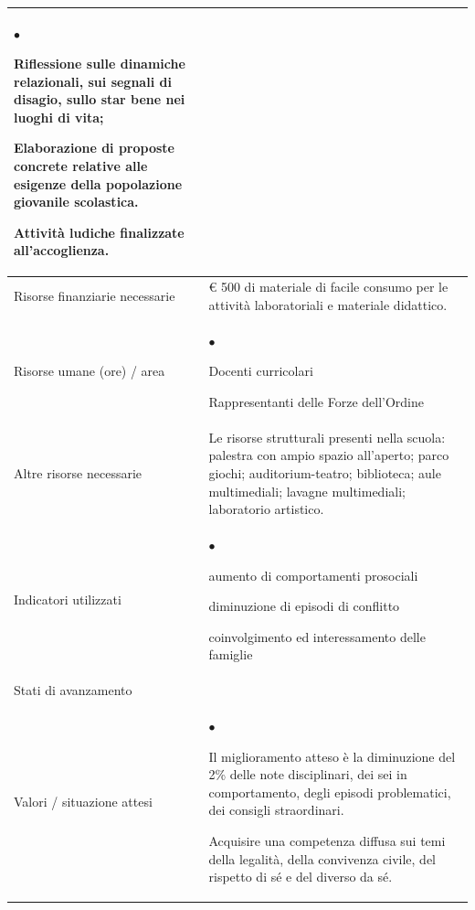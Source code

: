 \documentclass[12pt,a4paper,oneside]{memoir}
\newenvironment{elenco}{\begin{list}{$\bullet$}{%
              \setlength{\leftmargin}{4mm}%
              \setlength{\rightmargin}{1mm}%
               \setlength{\itemindent}{0mm}%
               \setlength{\labelwidth}{2mm}%
               \setlength{\labelsep}{2mm}%
              \setlength{\itemsep}{-\parsep}%
              \setlength{\partopsep}{0pt}%
              \setlength{\topsep}{0pt}%
             \setlength{\parskip}{0pt}%
              }}{\end{list}}
\begin{document}
\begin{footnotesize}
\begin{longtable}{|>{\raggedright}p{2.5cm}|>{\raggedright\arraybackslash}P{10cm}|}
\begin{elenco}
\item Riflessione sulle dinamiche relazionali, sui segnali di disagio, sullo star bene nei luoghi di vita;
\item Elaborazione di proposte concrete relative alle esigenze della popolazione giovanile scolastica.
\item Attività ludiche finalizzate all'accoglienza.
\end{elenco}\\[-4mm] \hline
Risorse finanziarie necessarie&€ 500 di materiale di facile consumo per le attività laboratoriali e materiale didattico. \\ \hline
Risorse umane (ore) / area&
\begin{elenco}
\item Docenti curricolari
\item  Rappresentanti delle Forze dell'Ordine
\end{elenco}\\[-4mm] \hline
Altre risorse necessarie&Le risorse strutturali presenti nella scuola: palestra con ampio spazio all'aperto; parco giochi; auditorium-teatro; biblioteca; aule multimediali; lavagne multimediali; laboratorio artistico. \\ \hline
Indicatori utilizzati&
\begin{elenco}
\item aumento di comportamenti prosociali
\item diminuzione di episodi di conflitto
\item coinvolgimento ed interessamento delle famiglie
\end{elenco}\\[-4mm] \hline
Stati di avanzamento&\\ \hline
Valori / situazione attesi&
\begin{elenco}
\item Il miglioramento atteso è la diminuzione del 2\% delle note disciplinari, dei sei in comportamento, degli episodi problematici, dei consigli straordinari. 
\item Acquisire una competenza diffusa sui temi della legalità, della convivenza civile, del rispetto di sé e del diverso da sé.
\end{elenco}\\ \hline
\end{longtable}
\end{footnotesize}

\vspace{24pt}
\end{document}
